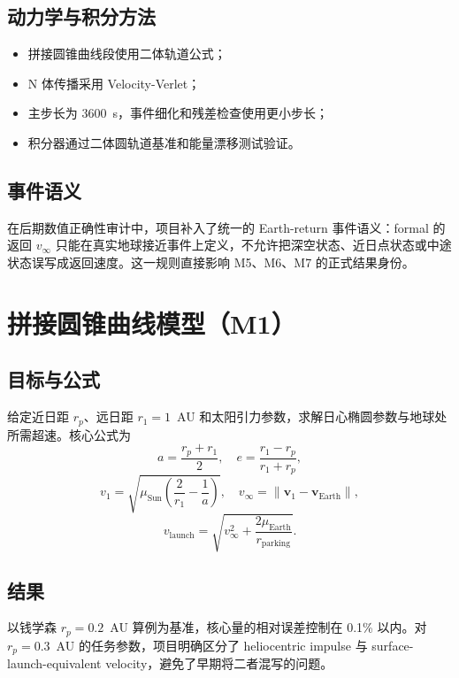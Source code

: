 \documentclass[12pt,a4paper]{ctexart}
\begin{document}
\subsection{动力学与积分方法}
\begin{itemize}
    \item 拼接圆锥曲线段使用二体轨道公式；
    \item N 体传播采用 Velocity-Verlet；
    \item 主步长为 3600~s，事件细化和残差检查使用更小步长；
    \item 积分器通过二体圆轨道基准和能量漂移测试验证。
\end{itemize}

\subsection{事件语义}
在后期数值正确性审计中，项目补入了统一的 Earth-return 事件语义：formal 的返回 $v_{\infty}$ 只能在真实地球接近事件上定义，不允许把深空状态、近日点状态或中途状态误写成返回速度。这一规则直接影响 M5、M6、M7 的正式结果身份。

\newpage

\section{拼接圆锥曲线模型（M1）}
\subsection{目标与公式}
给定近日距 $r_p$、远日距 $r_1=1$~AU 和太阳引力参数，求解日心椭圆参数与地球处所需超速。核心公式为\cite{bate1971}
\begin{equation}
a = \frac{r_p+r_1}{2},\quad
e = \frac{r_1-r_p}{r_1+r_p},
\end{equation}
\begin{equation}
v_1 = \sqrt{\mu_{\text{Sun}}\left(\frac{2}{r_1}-\frac{1}{a}\right)},\quad
v_{\infty} = \|\bm{v}_1-\bm{v}_{\text{Earth}}\|,
\end{equation}
\begin{equation}
v_{\text{launch}} = \sqrt{v_{\infty}^2+\frac{2\mu_{\text{Earth}}}{r_{\text{parking}}}}.
\end{equation}

\subsection{结果}
以钱学森 $r_p=0.2$~AU 算例为基准，核心量的相对误差控制在 0.1\% 以内。对 $r_p=0.3$~AU 的任务参数，项目明确区分了 heliocentric impulse 与 surface-launch-equivalent velocity，避免了早期将二者混写的问题。
\end{document}
